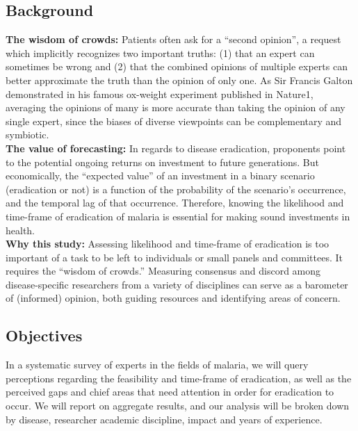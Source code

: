 \documentclass{article}
\begin{document}
\subsection*{Background}

\noindent \textbf{The wisdom of crowds:} Patients often ask for a “second opinion”, a request which implicitly recognizes two important truths: (1) that an expert can sometimes be wrong and (2) that the combined opinions of multiple experts can better approximate the truth than the opinion of only one. As Sir Francis Galton demonstrated in his famous ox-weight experiment published in Nature1, averaging the opinions of many is more accurate than taking the opinion of any single expert, since the biases of diverse viewpoints can be complementary and symbiotic. \\

\noindent \textbf{The value of forecasting:} In regards to disease eradication, proponents point to the potential ongoing returns on investment to future generations. But economically, the “expected value” of an investment in a binary scenario (eradication or not) is a function of the probability of the scenario’s occurrence, and the temporal lag of that occurrence. Therefore, knowing the likelihood and time-frame of eradication of malaria is essential for making sound investments in health. \\

\noindent \textbf{Why this study:} Assessing likelihood and time-frame of eradication is too important of a task to be left to individuals or small panels and committees. It requires the “wisdom of crowds.” Measuring consensus and discord among disease-specific researchers from a variety of disciplines can serve as a barometer of (informed) opinion, both guiding resources and identifying areas of concern.

\subsection*{Objectives}


In a systematic survey of experts in the fields of malaria, we will query perceptions regarding the feasibility and time-frame of eradication, as well as the perceived gaps and chief areas that need attention in order for eradication to occur. We will report on aggregate results, and our analysis will be broken down by disease, researcher academic discipline, impact and years of experience. \\
\end{document}
